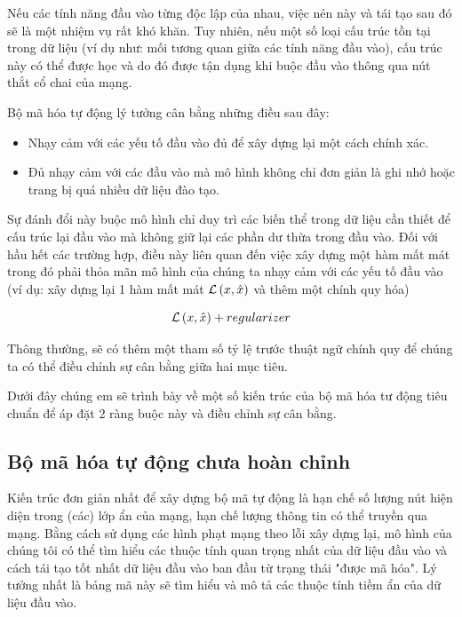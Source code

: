 \newpage
Nếu các tính năng đầu vào từng độc lập của nhau, việc nén này và tái tạo sau đó sẽ là
một nhiệm vụ rất khó khăn. Tuy nhiên, nếu một số loại cấu trúc tồn tại trong dữ liệu
(ví dụ như: mối tương quan giữa các tính năng đầu vào), cấu trúc này có thể được
học và do đó được tận dụng khi buộc đầu vào thông qua nút thắt cổ chai của mạng.

Bộ mã hóa tự động lý tưởng cân bằng những điều sau đây:
\begin{itemize}
    \item Nhạy cảm với các yếu tố đầu vào đủ để xây dựng lại một cách chính xác.
    \item Đủ nhạy cảm với các đầu vào mà mô hình không chỉ đơn giản là ghi
          nhớ hoặc trang bị quá nhiều dữ liệu đào tạo.
\end{itemize}

\newpage
Sự đánh đổi này buộc mô hình chỉ duy trì các biến thể trong dữ liệu cần
thiết để cấu trúc lại đầu vào mà không giữ lại các phần dư thừa trong đầu vào.
Đối với hầu hết các trường hợp, điều này liên quan đến việc xây dựng một hàm mất mát
trong đó phải thỏa mãn mô hình của chúng ta nhạy cảm với các yếu tố đầu vào
(ví dụ: xây dựng lại 1 hàm mất mát ${\cal L}\left( {x,\hat x} \right)$ và
thêm một chính quy hóa)


\begin{equation}
    {\cal L}\left( {x,\hat x} \right) + regularizer
\end{equation}

Thông thường, sẽ có thêm một tham số tỷ lệ trước thuật ngữ chính quy để chúng ta
có thể điều chỉnh sự cân bằng giữa hai mục tiêu.

Dưới đây chúng em sẽ trình bày về một số kiến trúc của bộ mã hóa tư động
tiêu chuẩn để áp đặt 2 ràng buộc này và điều chỉnh sự cân bằng.



\subsection{Bộ mã hóa tự động chưa hoàn chỉnh}

Kiến trúc đơn giản nhất để xây dựng bộ mã tự động là hạn chế số lượng
nút hiện diện trong (các) lớp ẩn của mạng, hạn chế lượng thông tin có
thể truyền qua mạng. Bằng cách sử dụng các hình phạt mạng theo lỗi xây dựng lại,
mô hình của chúng tôi có thể tìm hiểu các thuộc tính quan trọng nhất của dữ
liệu đầu vào và cách tái tạo tốt nhất dữ liệu đầu vào ban đầu từ trạng thái
"được mã hóa". Lý tưởng nhất là bảng mã này sẽ tìm hiểu và mô tả các thuộc
tính tiềm ẩn của dữ liệu đầu vào.



